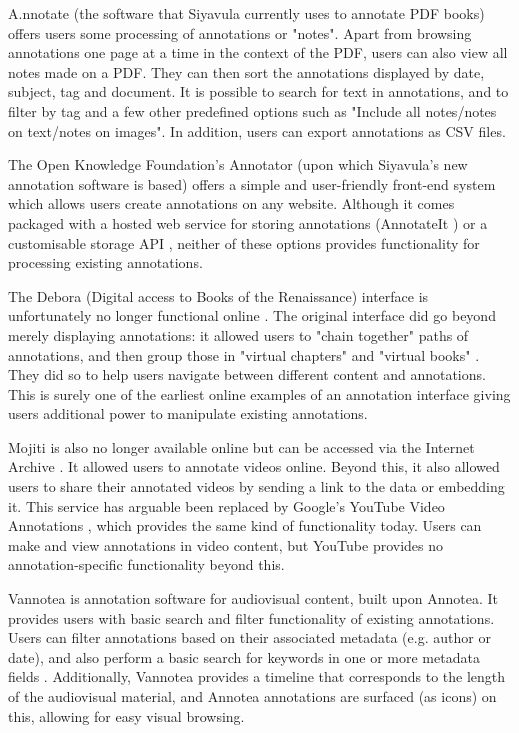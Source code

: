 A.nnotate \citep{AnnotateCom} (the software that Siyavula currently uses to annotate PDF books) offers users some processing of annotations or "notes". Apart from browsing annotations one page at a time in the context of the PDF, users can also view all notes made on a PDF. They can then sort the annotations displayed by date, subject, tag and document. It is possible to search for text in annotations, and to filter by tag and a few other predefined options such as "Include all notes/notes on text/notes on images". In addition, users can export annotations as CSV files.

The Open Knowledge Foundation's Annotator (upon which Siyavula's new annotation software is based) \citep{Annotator} offers a simple and user-friendly front-end system which allows users create annotations on any website. Although it comes packaged with a hosted web service for storing annotations (AnnotateIt \citep{AnnotateIt}) or a customisable storage API \citep{AnnotatorAPI}, neither of these options provides functionality for processing existing annotations.

The Debora (Digital access to Books of the Renaissance) interface \citep{debora} is unfortunately no longer functional online \citep{DeboraLink}. The original interface did go beyond merely displaying annotations: it allowed users to "chain together" paths of annotations, and then group those in "virtual chapters" and "virtual books" \citep{debora}. They did so to help users navigate between different content and annotations. This is surely one of the earliest online examples of an annotation interface giving users additional power to manipulate existing annotations. 

Mojiti \citep{Mojiti} is also no longer available online but can be accessed via the Internet Archive \citep{InternetArchive}. It allowed users to annotate videos online. Beyond this, it also allowed users to share their annotated videos by sending a link to the data or embedding it. This service has arguable been replaced by Google's YouTube Video Annotations \citep{YouTubeAnns}, which provides the same kind of functionality today. Users can make and view annotations in video content, but YouTube provides no annotation-specific functionality beyond this. 

Vannotea \citep{Vannotea} is annotation software for audiovisual content, built upon Annotea. It provides users with basic search and filter functionality of existing annotations. Users can filter annotations based on their associated metadata (e.g. author or date), and also perform a basic search for keywords in one or more metadata fields \citep{AnnoteaSidebarDoc}. Additionally, Vannotea provides a timeline that corresponds to the length of the audiovisual material, and Annotea annotations are surfaced (as icons) on this, allowing for easy visual browsing. 

